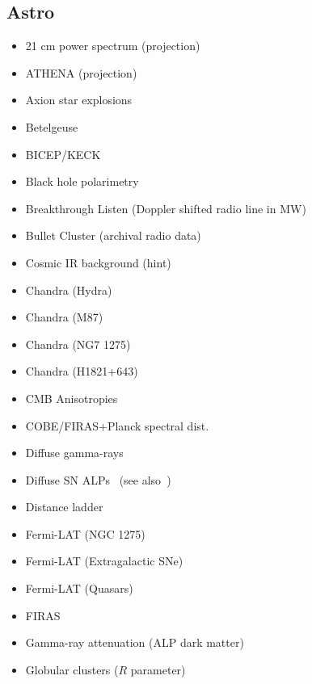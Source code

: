 \documentclass[8pt,twocolumn]{extarticle}
\begin{document}
\begin{mdframed}[everyline=true]
\subsection*{Astro}\vspace{-0.5em}
\begin{itemize}\setlength\itemsep{-0.5em}
	\item 21 cm power spectrum (projection)~\cite{Sun:2023acy}
	\item ATHENA (projection)~\cite{Sisk-Reynes:2022sqd}
	\item Axion star explosions~\cite{Escudero:2023vgv}
	\item Betelgeuse~\cite{Xiao:2020pra}
	\item BICEP/KECK~\cite{BICEPKeck:2021sbt}
	\item Black hole polarimetry~\cite{Gan:2023swl}
	\item Breakthrough Listen (Doppler shifted radio line in MW)~\cite{Keller:2021zbl}
    \item Bullet Cluster (archival radio data)~\cite{Chan:2021gjl}
  	\item Cosmic IR background (hint)~\cite{Kohri:2017ljt}
    \item Chandra (Hydra)~\cite{Wouters:2013hua}
    \item Chandra (M87)~\cite{Marsh:2017yvc}
    \item Chandra (NG7 1275)~\cite{Reynolds:2019uqt}
    \item Chandra (H1821+643)~\cite{Reynes:2021bpe}
    \item CMB Anisotropies~\cite{Capozzi:2023xie,Liu:2023nct}
    \item COBE/FIRAS+Planck spectral dist.~\cite{Bolliet:2020ofj}
    \item Diffuse gamma-rays~\cite{Caputo:2022mah}
    \item Diffuse SN ALPs~\cite{Calore:2021hhn} (see also~\cite{Calore:2020tjw})
    \item Distance ladder~\cite{Buen-Abad:2020zbd}
    \item Fermi-LAT (NGC 1275)~\cite{Fermi-LAT:2016nkz}
    \item Fermi-LAT (Extragalactic SNe)~\cite{Meyer:2020vzy}
   	\item Fermi-LAT (Quasars)~\cite{Davies:2022wvj}
   	\item FIRAS~\cite{Mondino:2024rif}
   	\item Gamma-ray attenuation (ALP dark matter)~\cite{Bernal:2022xyi}
    \item Globular clusters ($R$ parameter)~\cite{Ayala:2014pea}

\end{itemize}
\end{mdframed}
\end{document}
